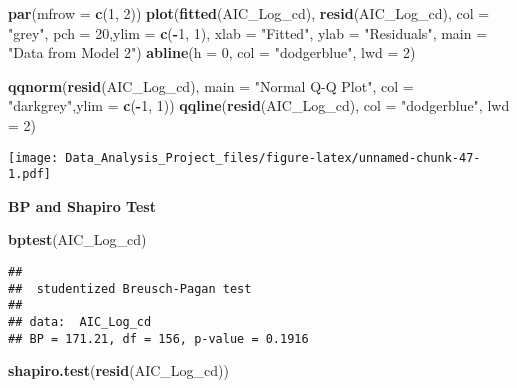 \documentclass[]{article}
\newenvironment{Shaded}{\begin{snugshade}}{\end{snugshade}}
\newcommand{\KeywordTok}[1]{\textcolor[rgb]{0.13,0.29,0.53}{\textbf{#1}}}
\newcommand{\DataTypeTok}[1]{\textcolor[rgb]{0.13,0.29,0.53}{#1}}
\newcommand{\DecValTok}[1]{\textcolor[rgb]{0.00,0.00,0.81}{#1}}
\newcommand{\StringTok}[1]{\textcolor[rgb]{0.31,0.60,0.02}{#1}}
\newcommand{\OperatorTok}[1]{\textcolor[rgb]{0.81,0.36,0.00}{\textbf{#1}}}
\newcommand{\NormalTok}[1]{#1}
\begin{document}
\begin{Shaded}
\begin{Highlighting}[]
 \KeywordTok{par}\NormalTok{(}\DataTypeTok{mfrow =} \KeywordTok{c}\NormalTok{(}\DecValTok{1}\NormalTok{, }\DecValTok{2}\NormalTok{))}
\KeywordTok{plot}\NormalTok{(}\KeywordTok{fitted}\NormalTok{(AIC_Log_cd), }\KeywordTok{resid}\NormalTok{(AIC_Log_cd), }\DataTypeTok{col =} \StringTok{"grey"}\NormalTok{, }\DataTypeTok{pch =} \DecValTok{20}\NormalTok{,}\DataTypeTok{ylim =} \KeywordTok{c}\NormalTok{(}\OperatorTok{-}\DecValTok{1}\NormalTok{, }\DecValTok{1}\NormalTok{),}
    \DataTypeTok{xlab =} \StringTok{"Fitted"}\NormalTok{, }\DataTypeTok{ylab =} \StringTok{"Residuals"}\NormalTok{, }\DataTypeTok{main =} \StringTok{"Data from Model 2"}\NormalTok{)}
\KeywordTok{abline}\NormalTok{(}\DataTypeTok{h =} \DecValTok{0}\NormalTok{, }\DataTypeTok{col =} \StringTok{"dodgerblue"}\NormalTok{, }\DataTypeTok{lwd =} \DecValTok{2}\NormalTok{)}

\KeywordTok{qqnorm}\NormalTok{(}\KeywordTok{resid}\NormalTok{(AIC_Log_cd), }\DataTypeTok{main =} \StringTok{"Normal Q-Q Plot"}\NormalTok{, }\DataTypeTok{col =} \StringTok{"darkgrey"}\NormalTok{,}\DataTypeTok{ylim =} \KeywordTok{c}\NormalTok{(}\OperatorTok{-}\DecValTok{1}\NormalTok{, }\DecValTok{1}\NormalTok{))}
\KeywordTok{qqline}\NormalTok{(}\KeywordTok{resid}\NormalTok{(AIC_Log_cd), }\DataTypeTok{col =} \StringTok{"dodgerblue"}\NormalTok{, }\DataTypeTok{lwd =} \DecValTok{2}\NormalTok{)}
\end{Highlighting}
\end{Shaded}

\texttt{[image: Data\_Analysis\_Project\_files/figure-latex/unnamed-chunk-47-1.pdf]}

\textbf{BP and Shapiro Test }

\begin{Shaded}
\begin{Highlighting}[]
\KeywordTok{bptest}\NormalTok{(AIC_Log_cd)}
\end{Highlighting}
\end{Shaded}

\begin{verbatim}
## 
##  studentized Breusch-Pagan test
## 
## data:  AIC_Log_cd
## BP = 171.21, df = 156, p-value = 0.1916
\end{verbatim}

\begin{Shaded}
\begin{Highlighting}[]
\KeywordTok{shapiro.test}\NormalTok{(}\KeywordTok{resid}\NormalTok{(AIC_Log_cd))}
\end{Highlighting}
\end{Shaded}
\end{document}
